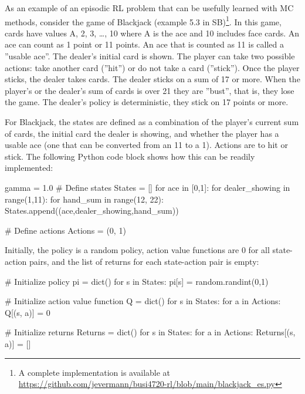 As an example of an episodic RL problem that can be usefully learned with MC methods, consider the game of Blackjack (example 5.3 in SB)\footnote{A complete implementation is available at \url{https://github.com/jevermann/busi4720-rl/blob/main/blackjack_es.py}}. In this game,
cards have values A, 2, 3, \ldots, 10 where A is the ace and 10 includes face cards. An ace can count as 1 point or 11 points. An ace that is counted as 11 is called a ''usable ace''. The dealer's initial card is shown. The player can take two possible actions: take another card (''hit'') or do not take a card (''stick''). Once the player sticks, the dealer takes cards. The dealer sticks on a sum of 17 or more. When the player's or the dealer's sum of cards is over 21 they are ''bust'', that is, they lose the game. The dealer's policy is deterministic, they stick on 17 points or more. 

For Blackjack, the states are defined as a combination of the player's current sum of cards, the initial card the dealer is showing, and whether the player has a usable ace (one that can be converted from an 11 to a 1). Actions are to hit or stick. The following Python code block shows how this can be readily implemented:

\begin{samepage}
\begin{pythoncode}
gamma = 1.0
# Define states
States = []
for ace in [0,1]:
    for dealer_showing in range(1,11):
        for hand_sum in range(12, 22):
            States.append((ace,dealer_showing,hand_sum))

# Define actions
Actions = (0, 1)
\end{pythoncode}
\end{samepage}

Initially, the policy is a random policy, action value functions are 0 for all state-action pairs, and the list of returns for each state-action pair is empty:

\begin{samepage}
\begin{pythoncode}
# Initialize policy
pi = dict()
for s in States:
    pi[s] = random.randint(0,1)

# Initialize action value function
Q = dict()
for s in States:
    for a in Actions:
        Q[(s, a)] = 0

# Initialize returns
Returns = dict()
for s in States:
    for a in Actions:
        Returns[(s, a)] = []
\end{pythoncode}
\end{samepage}


